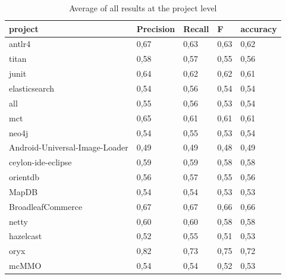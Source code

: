 \begin{table}[H]
\caption{\label{table:TopByProjectAverage} Average of all results at the project level}
\begin{tabular}{lllll}
\hline
\textbf{project}               & \textbf{Precision} & \textbf{Recall} & \textbf{F} & \textbf{accuracy} \\
\hline
antlr4                         & 0,67               & 0,63            & 0,63       & 0,62              \\
titan                          & 0,58               & 0,57            & 0,55       & 0,56              \\
junit                          & 0,64               & 0,62            & 0,62       & 0,61              \\
elasticsearch                  & 0,54               & 0,56            & 0,54       & 0,54              \\
all                            & 0,55               & 0,56            & 0,53       & 0,54              \\
mct                            & 0,65               & 0,61            & 0,61       & 0,61              \\
neo4j                          & 0,54               & 0,55            & 0,53       & 0,54              \\
Android-Universal-Image-Loader & 0,49               & 0,49            & 0,48       & 0,49              \\
ceylon-ide-eclipse             & 0,59               & 0,59            & 0,58       & 0,58              \\
orientdb                       & 0,56               & 0,57            & 0,55       & 0,56              \\
MapDB                          & 0,54               & 0,54            & 0,53       & 0,53              \\
BroadleafCommerce              & 0,67               & 0,67            & 0,66       & 0,66              \\
netty                          & 0,60               & 0,60            & 0,58       & 0,58              \\
hazelcast                      & 0,52               & 0,55            & 0,51       & 0,53              \\
\rowcolor[HTML]{FFE699} 
oryx                           & 0,82               & 0,73            & 0,75       & 0,72              \\
mcMMO                          & 0,54               & 0,54            & 0,52       & 0,53             
\end{tabular}
\end{table}